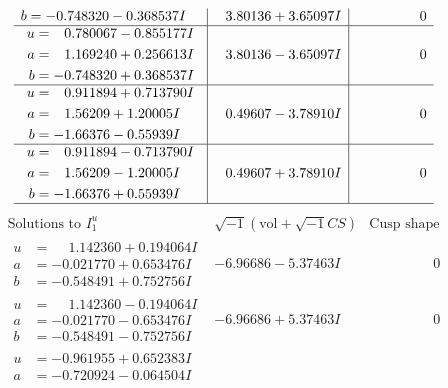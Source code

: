 \documentclass[1p]{elsarticle_modified}
\theoremstyle{definition}
\newcommand{\I}{\sqrt{-1}}
\begin{document}
$$\begin{array}{c|c|c}
\begin{aligned}
b &= -0.748320 - 0.368537 I\end{aligned}
 & \phantom{-}3.80136 + 3.65097 I & \phantom{-0.000000 } 0 \\ \hline\begin{aligned}
u &= \phantom{-}0.780067 - 0.855177 I \\
a &= \phantom{-}1.169240 + 0.256613 I \\
b &= -0.748320 + 0.368537 I\end{aligned}
 & \phantom{-}3.80136 - 3.65097 I & \phantom{-0.000000 } 0 \\ \hline\begin{aligned}
u &= \phantom{-}0.911894 + 0.713790 I \\
a &= \phantom{-}1.56209 + 1.20005 I \\
b &= -1.66376 - 0.55939 I\end{aligned}
 & \phantom{-}0.49607 - 3.78910 I & \phantom{-0.000000 } 0 \\ \hline\begin{aligned}
u &= \phantom{-}0.911894 - 0.713790 I \\
a &= \phantom{-}1.56209 - 1.20005 I \\
b &= -1.66376 + 0.55939 I\end{aligned}
 & \phantom{-}0.49607 + 3.78910 I & \phantom{-0.000000 } 0\\
 \hline 
 \end{array}$$\newpage$$\begin{array}{c|c|c}  
\text{Solutions to }I^u_{1}& \I (\text{vol} + \sqrt{-1}CS) & \text{Cusp shape}\\
 \hline 
\begin{aligned}
u &= \phantom{-}1.142360 + 0.194064 I \\
a &= -0.021770 + 0.653476 I \\
b &= -0.548491 + 0.752756 I\end{aligned}
 & -6.96686 - 5.37463 I & \phantom{-0.000000 } 0 \\ \hline\begin{aligned}
u &= \phantom{-}1.142360 - 0.194064 I \\
a &= -0.021770 - 0.653476 I \\
b &= -0.548491 - 0.752756 I\end{aligned}
 & -6.96686 + 5.37463 I & \phantom{-0.000000 } 0 \\ \hline\begin{aligned}
u &= -0.961955 + 0.652383 I \\
a &= -0.720924 - 0.064504 I \\

\end{aligned}
\end{array}$$
\end{document}
